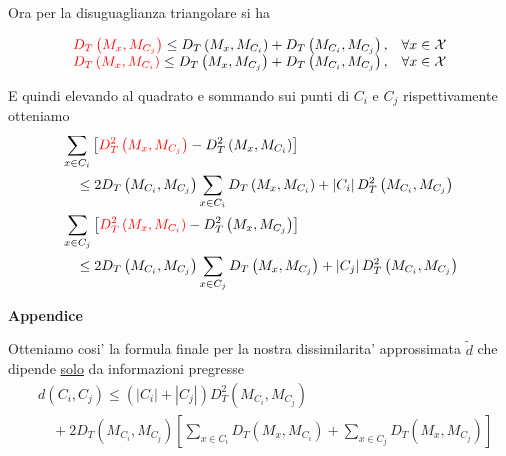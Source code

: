 \documentclass[a4, landscape]{seminar}
\theoremstyle{definition}
\def\bc{\begin{center}}
\def\ec{\end{center}}
\def\bs{\begin{slide}\begingroup\small}
\def\es{\endgroup\end{slide}}
\begin{document}
\bs
Ora per la disuguaglianza triangolare si ha

\begin{equation*}
  \begin{array}{ll}
    \textcolor{red}{D_{T}\left(M_{x}, M_{C_{j}}\right)} \leq D_{T}\left(M_{x}, M_{C_{i}}\right)+D_{T}\left(M_{C_{i}}, M_{C_{j}}\right), & \forall x \in \mathcal{X} \\
    \textcolor{red}{D_{T}\left(M_{x}, M_{C_{i}}\right)} \leq D_{T}\left(M_{x}, M_{C_{j}}\right)+D_{T}\left(M_{C_{i}}, M_{C_{j}}\right), & \forall x \in \mathcal{X}
    \end{array}
\end{equation*}

E quindi elevando al quadrato e sommando sui punti di $C_i$ e $C_j$ rispettivamente otteniamo
\begin{equation*}
\begin{aligned}
  &\sum_{x \in C_{i}}\left[\textcolor{red}{D_{T}^{2}\left(M_{x}, M_{C_{j}}\right)}-D_{T}^{2}\left(M_{x}, M_{C_{i}}\right)\right] \\
  &\quad \leq 2 D_{T}\left(M_{C_{i}}, M_{C_{j}}\right) \sum_{x \in C_{i}} D_{T}\left(M_{x}, M_{C_{i}}\right)+\left|C_{i}\right| D_{T}^{2}\left(M_{C_{i}}, M_{C_{j}}\right) \\
  &\sum_{x \in C_{j}}\left[\textcolor{red}{D_{T}^{2}\left(M_{x}, M_{C_{i}}\right)}-D_{T}^{2}\left(M_{x}, M_{C_{j}}\right)\right] \\
  &\quad \leq 2 D_{T}\left(M_{C_{i}}, M_{C_{j}}\right) \sum_{x \in C_{j}} D_{T}\left(M_{x}, M_{C_{j}}\right)+\left|C_{j}\right| D_{T}^{2}\left(M_{C_{i}}, M_{C_{j}}\right)
  \end{aligned}
\end{equation*}
\es

\bs
\bc{\bf\color{blue}Appendice}\ec
Otteniamo cosi' la formula finale per la nostra dissimilarita' approssimata $\tilde{d}$ che dipende \underline{solo}
da informazioni pregresse
\begin{equation*}
  \begin{aligned}
    &d\left(C_{i}, C_{j}\right) \leq\left(\left|C_{i}\right|+\left|C_{j}\right|\right) D_{T}^{2}\left(M_{C_{i}}, M_{C_{j}}\right) \\
    &\quad+2 D_{T}\left(M_{C_{i}}, M_{C_{j}}\right)\left[\sum_{x \in C_{i}} D_{T}\left(M_{x}, M_{C_{i}}\right)+\sum_{x \in C_{j}} D_{T}\left(M_{x}, M_{C_{j}}\right)\right]
  \end{aligned}
\end{equation*}
\es
\end{document}
